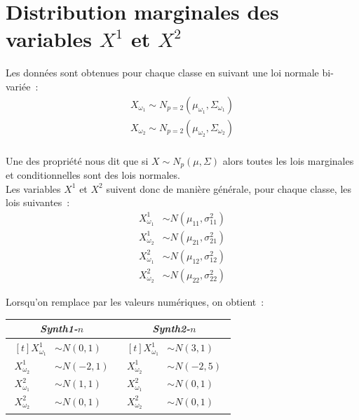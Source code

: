 \documentclass[a4paper,10pt]{report}
\begin{document}
\section{Distribution marginales des variables $X^1$ et $X^2$}


Les données sont obtenues pour chaque classe en suivant une loi normale bi-variée~: 
\begin{align*}
	X_{\omega_1} \sim N_{p=2}(\mu_{\omega_1}, \Sigma_{\omega_1}) \\
	X_{\omega_2} \sim N_{p=2}(\mu_{\omega_2}, \Sigma_{\omega_2}) \\
\end{align*}

Une des propriété nous dit que si $X \sim N_{p}(\mu, \Sigma)$ alors toutes les lois marginales et conditionnelles sont des lois normales.\\


Les variables $X^1$ et $X^2$ suivent donc de manière générale, pour chaque classe, les lois suivantes~:
\begin{align*}
X_{\omega_1}^1 &\sim N(\mu_{11}, \sigma_{11}^2) \\
X_{\omega_2}^1 &\sim N(\mu_{21}, \sigma_{21}^2)  \\
X_{\omega_1}^2 &\sim N(\mu_{12}, \sigma_{12}^2) \\
X_{\omega_2}^2 &\sim N(\mu_{22}, \sigma_{22}^2) 
\end{align*}
	

Lorsqu'on remplace par les valeurs numériques, on obtient~:
\begin{center}
\begin{tabular}{c|c}
	\centering
	\textit{Synth1-$n$} & \textit{Synth2-$n$} \\
	\hline
	$ \begin{aligned}[t]
	X_{\omega_1}^1 &\sim N(0,1) \\
	X_{\omega_2}^1 &\sim N(-2,1) \\
	X_{\omega_1}^2 &\sim N(1,1) \\
	X_{\omega_2}^2 &\sim N(0,1)
	\end{aligned} $     
	&
	$ \begin{aligned}[t]
	X_{\omega_1}^1 &\sim N(3,1) \\
	X_{\omega_2}^1 &\sim N(-2,5) \\
	X_{\omega_1}^2 &\sim N(0,1) \\
	X_{\omega_2}^2 &\sim N(0,1)
	\end{aligned} $ \\
\end{tabular}
\end{center}
\end{document}
